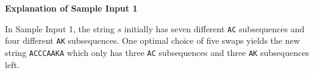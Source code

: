 \textbf{Explanation of Sample Input 1}


In Sample Input 1, the string $s$ initially has seven different \texttt{AC} subsequences and four different \texttt{AK} subsequences. One optimal choice of five swaps yields the new string \texttt{ACCCAAKA} which only has three \texttt{AC} subsequences and three \texttt{AK} subsequences left.